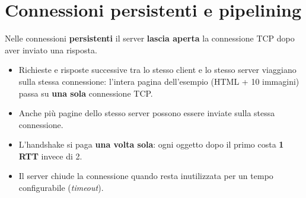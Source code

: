 \section{Connessioni persistenti e pipelining}

Nelle connessioni \textbf{persistenti} il server \textbf{lascia aperta} la connessione TCP dopo aver
inviato una risposta.

\begin{itemize}
    \item Richieste e risposte successive tra lo stesso client e lo stesso server viaggiano sulla stessa
          connessione: l'intera pagina dell'esempio (HTML + 10 immagini) passa su \textbf{una sola}
          connessione TCP.
    \item Anche più pagine dello stesso server possono essere inviate sulla stessa connessione.
    \item L'handshake si paga \textbf{una volta sola}: ogni oggetto dopo il primo costa \textbf{1 RTT} invece di 2.
    \item Il server chiude la connessione quando resta inutilizzata per un tempo configurabile (\emph{timeout}).
\end{itemize}


